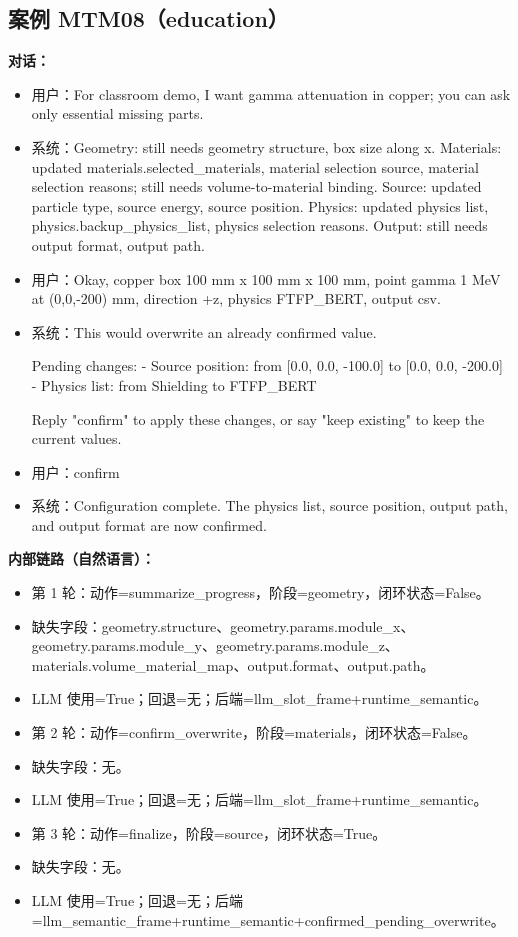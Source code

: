 \documentclass[11pt]{ctexart}
\begin{document}
\subsection{案例 MTM08（education）}
\textbf{对话：}
\begin{itemize}
\item 用户：For classroom demo, I want gamma attenuation in copper; you can ask only essential missing parts.
\item 系统：Geometry: still needs geometry structure, box size along x. Materials: updated materials.selected\_materials, material selection source, material selection reasons; still needs volume-to-material binding. Source: updated particle type, source energy, source position. Physics: updated physics list, physics.backup\_physics\_list, physics selection reasons. Output: still needs output format, output path.
\item 用户：Okay, copper box 100 mm x 100 mm x 100 mm, point gamma 1 MeV at (0,0,-200) mm, direction +z, physics FTFP\_BERT, output csv.
\item 系统：This would overwrite an already confirmed value.

Pending changes:
- Source position: from [0.0, 0.0, -100.0] to [0.0, 0.0, -200.0]
- Physics list: from Shielding to FTFP\_BERT

Reply "confirm" to apply these changes, or say "keep existing" to keep the current values.
\item 用户：confirm
\item 系统：Configuration complete. The physics list, source position, output path, and output format are now confirmed.
\end{itemize}
\textbf{内部链路（自然语言）：}
\begin{itemize}
\item 第 1 轮：动作=summarize\_progress，阶段=geometry，闭环状态=False。
\item 缺失字段：geometry.structure、geometry.params.module\_x、geometry.params.module\_y、geometry.params.module\_z、materials.volume\_material\_map、output.format、output.path。
\item LLM 使用=True；回退=无；后端=llm\_slot\_frame+runtime\_semantic。
\item 第 2 轮：动作=confirm\_overwrite，阶段=materials，闭环状态=False。
\item 缺失字段：无。
\item LLM 使用=True；回退=无；后端=llm\_slot\_frame+runtime\_semantic。
\item 第 3 轮：动作=finalize，阶段=source，闭环状态=True。
\item 缺失字段：无。
\item LLM 使用=True；回退=无；后端=llm\_semantic\_frame+runtime\_semantic+confirmed\_pending\_overwrite。
\end{itemize}
\end{document}
